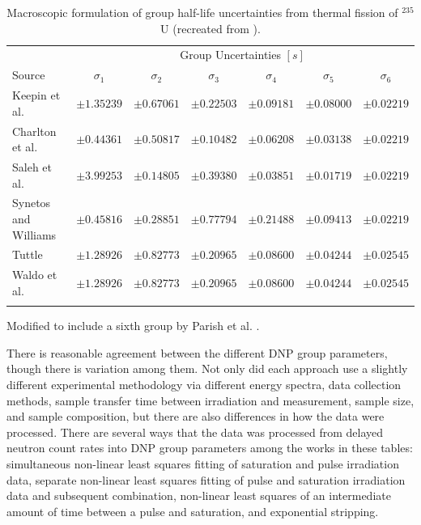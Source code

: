 \begin{table}[!h]
\centering
\begin{threeparttable}
\caption{Macroscopic formulation of group half-life uncertainties from thermal fission of $^{235}$U (recreated from \cite{parish1999status}).}
\begin{tabular}{lcccccc}
\hline
 & \multicolumn{6}{c}{Group Uncertainties $[s]$} \\
Source & $\sigma_1$ & $\sigma_2$ & $\sigma_3$ & $\sigma_4$ & $\sigma_5$ & $\sigma_6$ \\
\hline
Keepin et al. \cite{keepin1957delayed}   & $\pm1.35239$ & $\pm0.67061$ & $\pm0.22503$ & $\pm0.09181$ & $\pm0.08000$ & $\pm0.02219$ \\
Charlton et al. \cite{charlton1996delayed}\tnote{*} & $\pm0.44361$ & $\pm0.50817$ & $\pm0.10482$ & $\pm0.06208$ & $\pm0.03138$ & $\pm0.02219$ \\
Saleh et al. \cite{saleh1997measurements} & $\pm3.99253$ & $\pm0.14805$ & $\pm0.39380$ & $\pm0.03851$ & $\pm0.01719$ & $\pm0.02219$ \\
Synetos and Williams \cite{synetos1983delayed}\tnote{*} & $\pm0.45816$ & $\pm0.28851$ & $\pm0.77794$ & $\pm0.21488$ & $\pm0.09413$ & $\pm0.02219$ \\
Tuttle \cite{tuttle1975delayed}    & $\pm1.28926$ & $\pm0.82773$ & $\pm0.20965$ & $\pm0.08600$ & $\pm0.04244$ & $\pm0.02545$ \\
Waldo et al.\cite{waldo1981delayed}    & $\pm1.28926$ & $\pm0.82773$ & $\pm0.20965$ & $\pm0.08600$ & $\pm0.04244$ & $\pm0.02545$ \\

\hline
\label{tab:macro-half-lives-delta}
\end{tabular}
\begin{tablenotes}
\item[*] Modified to include a sixth group by Parish et al. \cite{parish1999status}.
\end{tablenotes}
\end{threeparttable}
\end{table}

There is reasonable agreement between the different \gls{DNP} group parameters, though there is variation among them.
Not only did each approach use a slightly different experimental methodology via different energy spectra, data collection methods, sample transfer time between irradiation and measurement, sample size, and sample composition, but there are also differences in how the data were processed.
There are several ways that the data was processed from delayed neutron count rates into \gls{DNP} group parameters among the works in these tables: simultaneous non-linear least squares fitting of saturation and pulse irradiation data, separate non-linear least squares fitting of pulse and saturation irradiation data and subsequent combination, non-linear least squares of an intermediate amount of time between a pulse and saturation, and exponential stripping.

